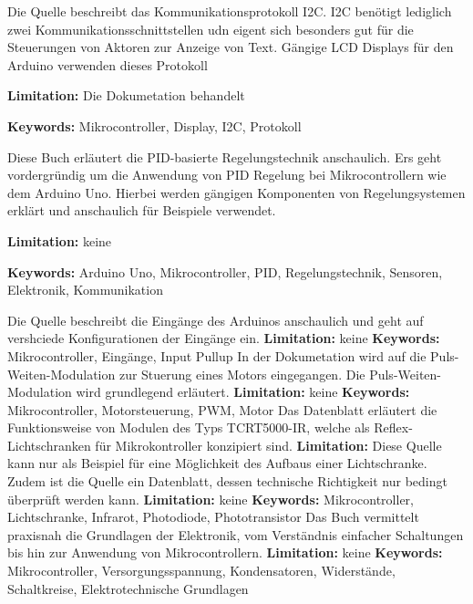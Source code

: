 { 
	Die Quelle \cite{ArduinoI2C:2024} beschreibt das Kommunikationsprotokoll I2C. I2C benötigt lediglich zwei Kommunikationsschnittstellen udn eigent sich besonders gut für die Steuerungen von Aktoren zur Anzeige von Text. Gängige LCD Displays für den Arduino verwenden dieses Protokoll
	
	\textbf{Limitation:} Die Dokumetation behandelt 
	
	\scriptsize{\textbf{Keywords:}  Mikrocontroller, Display, I2C, Protokoll}
}
{ 
	Diese Buch  \cite{Ibrahim:2023} erläutert die PID-basierte Regelungstechnik anschaulich. Ers geht vordergründig um die Anwendung von PID Regelung bei Mikrocontrollern wie dem Arduino Uno. Hierbei werden gängigen Komponenten von Regelungsystemen erklärt und anschaulich für Beispiele verwendet. 
	
	\bigskip
	
	\textbf{Limitation:} keine 
	
	\scriptsize{\textbf{Keywords:} Arduino Uno, Mikrocontroller, PID, Regelungstechnik, Sensoren, Elektronik, Kommunikation }
}
{ 
	Die Quelle \cite{ArduinoPins:2024} beschreibt die Eingänge des Arduinos anschaulich und geht auf vershciede Konfigurationen der Eingänge ein. 
	\textbf{Limitation:} keine 
	\scriptsize{\textbf{Keywords:}  Mikrocontroller, Eingänge, Input Pullup}
} 
{ 
	In der Dokumetation \cite{ArduinoPWM:2024} wird auf die Puls-Weiten-Modulation zur Stuerung eines Motors eingegangen. Die Puls-Weiten-Modulation wird grundlegend erläutert.
	\textbf{Limitation:} keine 
	\scriptsize{\textbf{Keywords:}  Mikrocontroller, Motorsteuerung, PWM, Motor}
} 
{ Das Datenblatt \cite{AZ:2026} erläutert die Funktionsweise von Modulen des Typs TCRT5000-IR, welche als Reflex-Lichtschranken für Mikrokontroller konzipiert sind. 
	\textbf{Limitation:} Diese Quelle kann nur als Beispiel für eine Möglichkeit des Aufbaus einer Lichtschranke. Zudem ist die Quelle ein Datenblatt, dessen technische Richtigkeit nur bedingt überprüft werden kann. 
	\textbf{Limitation:} keine 
	\scriptsize{\textbf{Keywords:}  Mikrocontroller, Lichtschranke, Infrarot, Photodiode, Phototransistor}
} 
{ 
	Das Buch \cite{Bartlett:2023a} vermittelt praxisnah die Grundlagen der Elektronik, vom Verständnis einfacher Schaltungen bis hin zur Anwendung von Mikrocontrollern.
	\textbf{Limitation:} keine 
	\scriptsize{\textbf{Keywords:}  Mikrocontroller, Versorgungsspannung, Kondensatoren, Widerstände, Schaltkreise, Elektrotechnische Grundlagen  }
}  

